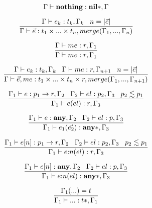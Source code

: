 \[
\Gamma \vdash \mathbf{nothing}:\mathbf{nil}{*}, \Gamma
\]

\[
\dfrac{\Gamma \vdash e_{k}:t_{k}, \Gamma_{k} \;\;\;
       n = |\vec{e}|}
      {\Gamma \vdash \vec{e}:t_{1} \times ... \times t_{n}, merge(\Gamma_{1}, ..., \Gamma_{n})}
\]

\[
\dfrac{\Gamma \vdash me:r, \Gamma_{1}}
      {\Gamma \vdash me:r, \Gamma_{1}}
\]

\[
\dfrac{\Gamma \vdash e_{k}:t_{k}, \Gamma_{k} \;\;\;
       \Gamma \vdash me:r, \Gamma_{n + 1} \;\;\;
       n = |\vec{e}|}
      {\Gamma \vdash \vec{e}, me:t_{1} \times ... \times t_{n} \times r, merge(\Gamma_{1}, ..., \Gamma_{n+1})}
\]

\[
\dfrac{\Gamma_{1} \vdash e:p_{1} \rightarrow r, \Gamma_{2} \;\;\;
       \Gamma_{2} \vdash el:p_{2}, \Gamma_{3} \;\;\;
       p_{2} \lesssim p_{1}}
      {\Gamma_{1} \vdash e(el):r, \Gamma_{3}}
\]

\[
\dfrac{\Gamma_{1} \vdash e:\mathbf{any}, \Gamma_{2} \;\;\;
       \Gamma_{2} \vdash el:p, \Gamma_{3}}
      {\Gamma_{1} \vdash e_{1}(\vec{e_{2}}):\mathbf{any}{*}, \Gamma_{3}}
\]

\[
\dfrac{\Gamma_{1} \vdash e[n]:p_{1} \rightarrow r, \Gamma_{2} \;\;\;
       \Gamma_{2} \vdash el:p_{2}, \Gamma_{3} \;\;\;
       p_{2} \lesssim p_{1}}
      {\Gamma_{1} \vdash e{:}n(el):r, \Gamma_{3}}
\]

\[
\dfrac{\Gamma_{1} \vdash e[n]:\mathbf{any}, \Gamma_{2} \;\;\;
       \Gamma_{2} \vdash el:p, \Gamma_{3}}
      {\Gamma_{1} \vdash e{:}n(el):\mathbf{any}{*}, \Gamma_{3}}
\]

\[
\dfrac{\Gamma_{1}({...}) = t}
      {\Gamma_{1} \vdash {...}:t{*}, \Gamma_{1}}
\]


